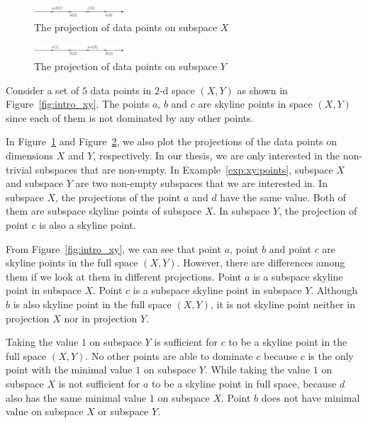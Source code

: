\begin{figure}[H]
\centering
\includegraphics[width=0.3\textwidth]{figs/intro_x.eps}
\caption{The projection of data points on subspace $X$}
\label{fig:intro_x}
\end{figure}

\begin{figure}[H]
\centering
\includegraphics[width=0.3\textwidth]{figs/intro_y.eps}
\caption{The projection of data points on subspace $Y$}
\label{fig:intro_y}
\end{figure}

\begin{example} 
\label{exp:xy:points}
Consider a set of $5$ data points in 2-d space $(X, Y)$ as shown in Figure~\ref{fig:intro_xy}. The points $a$, $b$ and $c$ are skyline points in space $(X, Y)$ since each of them is not dominated by any other points.
\end{example}

In Figure~\ref{fig:intro_x} and Figure~\ref{fig:intro_y}, we also plot the projections of the data points on dimensions $X$ and $Y$, respectively. In our thesis, we are only interested in the non-trivial subspaces that are non-empty. In Example~\ref{exp:xy:points}, subspace $X$ and subspace $Y$ are two non-empty subspaces that we are interested in. In subspace $X$, the projections of the point $a$ and $d$ have the same value. Both of them are subspace skyline points of subspace $X$. In subspace $Y$, the projection of point $c$ is also a skyline point.

From Figure~\ref{fig:intro_xy}, we can see that point $a$, point $b$ and point $c$ are skyline points in the full space $(X, Y)$. However, there are differences among them if we look at them in different projections. Point $a$ is a subspace skyline point in subspace $X$. Point $c$ is a subspace skyline point in subspace $Y$. Although $b$ is also skyline point in the full space $(X, Y)$, it is not skyline point neither in projection $X$ nor in projection $Y$.

Taking the value $1$ on subspace $Y$ is sufficient for $c$ to be a skyline point in the full space $(X, Y)$. No other points are able to dominate $c$ because $c$ is the only point with the minimal value $1$ on subspace $Y$. While taking the value $1$ on subspace $X$ is not sufficient for $a$ to be a skyline point in full space, because $d$ also has the same minimal value $1$ on subspace $X$. Point $b$ does not have minimal value on subspace $X$ or subspace $Y$.

